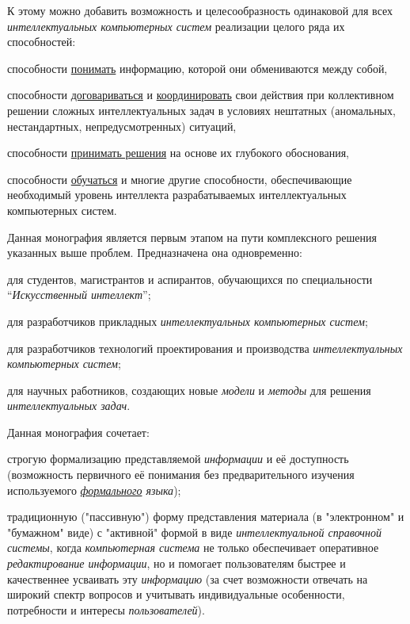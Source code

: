 \begin{SCn}
{К этому можно добавить возможность и целесообразность  одинаковой  для всех \textit{интеллектуальных компьютерных систем} реализации целого ряда их способностей: 
\begin{scnitemize}
	\item способности \uline{понимать} информацию, которой они обмениваются между собой,
	\item способности  \uline{договариваться} и \uline{координировать} свои действия при коллективном решении сложных интеллектуальных задач в условиях нештатных (аномальных, нестандартных, непредусмотренных) ситуаций,
	\item способности \uline{принимать решения} на основе их глубокого  обоснования,
	\item способности \uline{обучаться} и многие другие способности, обеспечивающие необходимый уровень интеллекта разрабатываемых интеллектуальных компьютерных систем.
\end{scnitemize}

Данная монография является первым этапом на пути комплексного решения указанных выше проблем.
Предназначена она одновременно:
\begin{scnitemize}
	\item для студентов, магистрантов и аспирантов, обучающихся по специальности ``\textit{Искусственный интеллект}'';
	\item для разработчиков прикладных \textit{интеллектуальных компьютерных систем};
	\item для разработчиков технологий проектирования и производства \textit{интеллектуальных компьютерных систем};
	\item для научных работников, создающих новые \textit{модели} и \textit{методы} для решения \textit{интеллектуальных задач}.
\end{scnitemize}

Данная монография сочетает:
\begin{scnitemize}
	\item строгую формализацию представляемой \textit{информации} и её доступность (возможность первичного её понимания без предварительного изучения используемого \textit{\uline{формального} языка});
	\item традиционную ("пассивную"{}) форму представления материала (в "электронном"{} и "бумажном"{} виде) с "активной"{} формой в виде \textit{интеллектуальной справочной системы}, когда \textit{компьютерная система} не только обеспечивает оперативное \textit{редактирование информации}, но и помогает пользователям  быстрее и  качественнее усваивать эту \textit{информацию} (за счет возможности отвечать на широкий спектр вопросов и учитывать индивидуальные особенности, потребности и интересы \textit{пользователей}). 
\end{scnitemize}

}
\end{SCn}
